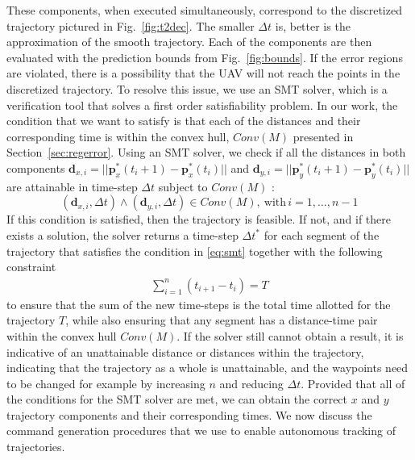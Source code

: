 \documentclass[letterpaper, 10 pt, conference]{ieeeconf}  %
\newcommand\NB[1]{$\spadesuit$\footnote{NB: #1}}
\begin{document}
These components, when executed simultaneously, correspond to the discretized trajectory pictured in Fig.~\ref{fig:t2dec}. The smaller $\Delta t$ is, better is the approximation of the smooth trajectory. Each of the components are then evaluated with the prediction bounds from Fig.~\ref{fig:bounds}. If the error regions are violated, there is a possibility that the UAV will not reach the points in the discretized trajectory. To resolve this issue, we use an SMT solver, which is a verification tool that solves a first order satisfiability problem. In our work, the condition that we want to satisfy is that each of the distances and their corresponding time is within the convex hull, $Conv(M)$ presented in Section~\ref{sec:regerror}. Using an SMT solver, we check if all the distances in both components $\bm{d}_{x,i}=||\bm{p}_x^*(t_i+1)-\bm{p}_x^*(t_i)||$ and $\bm{d}_{y,i}=||\bm{p}_y^*(t_i+1)-\bm{p}_y^*(t_i)||$ are attainable in time-step $\Delta t$ subject to $Conv(M)$ : 
\begin{equation}\label{eq:smt}
    (\bm{d}_{x,i},\Delta t) \wedge (\bm{d}_{y,i},\Delta t) \in Conv(M), ~\textrm{with}\, i = 1,\ldots,n-1
\end{equation}
If this condition is satisfied, then the trajectory is feasible. If not, and if there exists a solution, the solver returns a time-step $\Delta t^*$ for each segment of the trajectory that satisfies the condition in \eqref{eq:smt} together with the following constraint
\begin{align}
     \sum_{i=1}^n(t_{i+1}-t_i) = T
\end{align}
to ensure that the sum of the new time-steps is the total time allotted for the trajectory $T$, while also ensuring that any segment has a distance-time pair within the convex hull $Conv(M)$. If the solver still cannot obtain a result, it is indicative of an unattainable distance or distances within the trajectory, indicating that the trajectory as a whole is unattainable, and the waypoints need to be changed for example by increasing $n$ and reducing $\Delta t$. Provided that all of the conditions for the SMT solver are met, we can obtain the correct $x$ and $y$ trajectory components and their corresponding times. We now discuss the command generation procedures that we use to enable autonomous tracking of trajectories.
\end{document}
